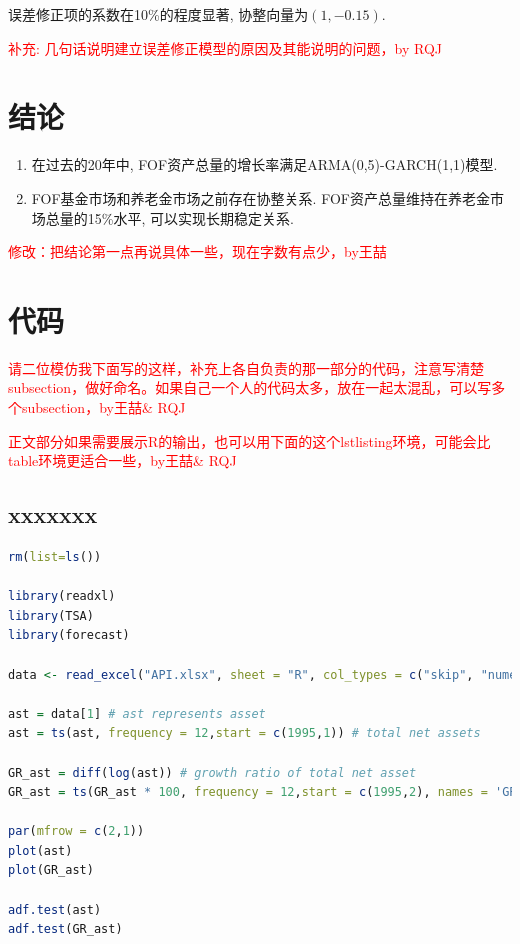 \documentclass[10.5pt,onecolumn,a4paper]{article}%
\begin{document}
误差修正项的系数在10\%的程度显著, 协整向量为$(1, -0.15)$.

\textcolor{red}{补充: 几句话说明建立误差修正模型的原因及其能说明的问题，by RQJ}

\section{结论}
    \begin{enumerate}
        \item 在过去的20年中, FOF资产总量的增长率满足ARMA(0,5)-GARCH(1,1)模型.
        \item FOF基金市场和养老金市场之前存在协整关系. FOF资产总量维持在养老金市场总量的15\%水平, 可以实现长期稳定关系.
    \end{enumerate}

\textcolor{red}{修改：把结论第一点再说具体一些，现在字数有点少，by王喆}
\clearpage
\appendix

\section{代码}
\textcolor{red}{请二位模仿我下面写的这样，补充上各自负责的那一部分的代码，注意写清楚subsection，做好命名。如果自己一个人的代码太多，放在一起太混乱，可以写多个subsection，by王喆\& RQJ}

\textcolor{red}{正文部分如果需要展示R的输出，也可以用下面的这个lstlisting环境，可能会比table环境更适合一些，by王喆\& RQJ}
\subsection{xxxxxxx}
\begin{lstlisting}[language=R,frame=single]
rm(list=ls())

library(readxl)
library(TSA)
library(forecast)

data <- read_excel("API.xlsx", sheet = "R", col_types = c("skip", "numeric", "numeric"))

ast = data[1] # ast represents asset
ast = ts(ast, frequency = 12,start = c(1995,1)) # total net assets

GR_ast = diff(log(ast)) # growth ratio of total net asset
GR_ast = ts(GR_ast * 100, frequency = 12,start = c(1995,2), names = 'GR_ast')

par(mfrow = c(2,1))
plot(ast)
plot(GR_ast)

adf.test(ast)
adf.test(GR_ast)
\end{lstlisting}
\end{document}
